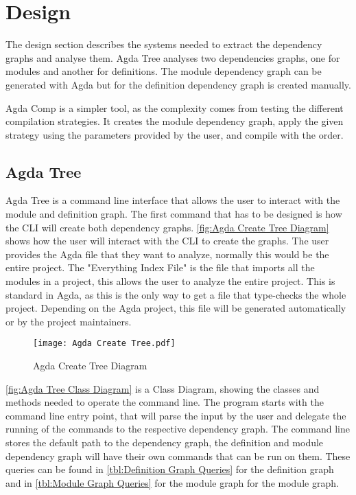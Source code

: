 
\chapter{Design}

The design section describes the systems needed to extract the dependency
graphs and analyse them. Agda Tree analyses two dependencies graphs, one for
modules and another for definitions. The module dependency graph can be
generated with Agda but for the definition dependency graph is created
manually.

Agda Comp is a simpler tool, as the complexity comes from testing the different
compilation strategies. It creates the module dependency graph, apply the
given strategy using the parameters provided by the user, and compile with the
order. 

\pagebreak

\section{Agda Tree}

Agda Tree is a command line interface that allows the user to interact with the
module and definition graph. The first command that has to be designed is how
the CLI will create both dependency graphs. \cref{fig:Agda Create Tree
Diagram} shows how the user will interact with the CLI to create the graphs.
The user provides the Agda file that they want to analyze, normally this would
be the entire project. The "Everything Index File" is the file that imports all
the modules in a project, this allows the user to analyze the entire project.
This is standard in Agda, as this is the only way to get a file that type-checks the whole project. Depending on the Agda project, this file will be
generated automatically or by the project maintainers.
\begin{figure}[H]
    \centering
    \texttt{[image: Agda Create Tree.pdf]}
    \caption{Agda Create Tree Diagram}
    \label{fig:Agda Create Tree Diagram}
\end{figure} 

\pagebreak

\cref{fig:Agda Tree Class Diagram} is a Class Diagram, showing the
classes and methods needed to operate the command line. The program starts with
the command line entry point, that will parse the input by the user and
delegate the running of the commands to the respective dependency graph. The
command line stores the default path to the dependency graph, the definition
and module dependency graph will have their own commands that can be run on
them. These queries can be found in \cref{tbl:Definition Graph Queries}
for the definition graph and in \cref{tbl:Module Graph Queries} for the
module graph for the module graph.

